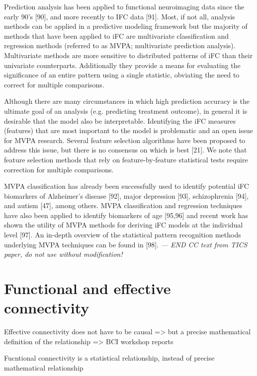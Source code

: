 \documentclass[5p]{elsarticle}
\begin{document}
Prediction analysis has been applied to functional neuroimaging data since the early 90’s [90], and more
recently to IFC data [91]. Most, if not all, analysis methods can be applied in a predictive modeling
framework but the majority of methods that have been applied to iFC are multivariate classification and
regression methods (referred to as MVPA; multivariate prediction analysis). Multivariate methods are more
sensitive to distributed patterns of iFC than their univariate counterparts. Additionally they provide a
means for evaluating the significance of an entire pattern using a single statistic, obviating the need
to correct for multiple comparisons. 

Although there are many circumstances in which high prediction accuracy is the ultimate goal of an
analysis (e.g. predicting treatment outcome), in general it is desirable that the model also be
interpretable. Identifying the iFC measures (features) that are most important to the model is
problematic and an open issue for MVPA research. Several feature selection algorithms have been proposed
to address this issue, but there is no consensus on which is best [21]. We note that feature selection
methods that rely on feature-by-feature statistical tests require correction for multiple comparisons. 

MVPA classification has already been successfully used to identify potential iFC biomarkers of Alzheimer’s
disease [92], major depression [93], schizophrenia [94], and autism [47], among others. MVPA
classification and regression techniques have also been applied to identify biomarkers of age [95,96]
and recent work has shown the utility of MVPA methods for deriving iFC models at the individual
level [97]. An in-depth overview of the statistical pattern recognition methods underlying MVPA
techniques can be found in [98].
\emph{ --- END CC text from TICS paper, do not use without modification!}



\section{Functional and effective connectivity}

Effective connectivity does not have to be causal => but a precise mathematical
definition of the relationship => BCI workshop reports

Fucntional connectivity is a statistical relationship, instead of precise mathematical
relationship
\end{document}
